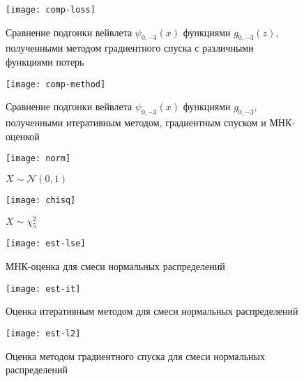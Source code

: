 \documentclass[../paper.tex]{subfiles}
\begin{document}
\begin{figure}[h]
	\begin{minipage}{0.48\textwidth}
		\centering
		\texttt{[image: comp-loss]}
		\caption{Сравнение подгонки вейвлета $\psi_{0,-3}(x)$ функциями $g_{0,-3}(z)$, полученными методом градиентного спуска с различными функциями потерь}
		\label{comp-loss}
	\end{minipage}\hfill
	\begin{minipage}{0.48\textwidth}
		\centering
		\texttt{[image: comp-method]}
		\caption{Сравнение подгонки вейвлета $\psi_{0,-3}(x)$ функциями $g_{0,-3}$, полученными итеративным методом, градиентным спуском и МНК-оценкой}
		\label{comp-method}
	\end{minipage}\hfill
\end{figure}

\begin{figure}[h]
	\begin{minipage}{0.48\textwidth}
		\centering
		\texttt{[image: norm]}
		\caption{$X \sim \mathcal{N}(0, 1)$}
		\label{norm}
	\end{minipage}\hfill
	\begin{minipage}{0.48\textwidth}
		\centering
		\texttt{[image: chisq]}
		\caption{$X \sim \chi^2_5$}
		\label{chisq}
	\end{minipage}\hfill
\end{figure}

\begin{figure}[h]
	\begin{minipage}{0.48\textwidth}
		\centering
		\texttt{[image: est-lse]}
		\caption{МНК-оценка для смеси нормальных распределений}
		\label{est-lse}
	\end{minipage}\hfill
	\begin{minipage}{0.48\textwidth}
		\centering
		\texttt{[image: est-it]}
		\caption{Оценка итеративным методом для смеси нормальных распределений}
		\label{est-it}
	\end{minipage}\hfill
\end{figure}

\begin{figure}[h]
	\begin{minipage}{0.48\textwidth}
		\centering
		\texttt{[image: est-l2]}
		\caption{Оценка методом градиентного спуска для смеси нормальных распределений}
		\label{est-l2}
	\end{minipage}\hfill
\end{figure}
\end{document}
